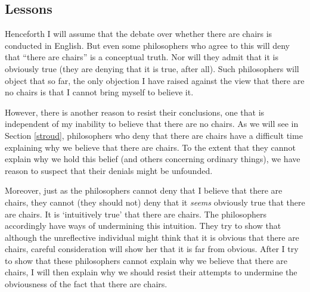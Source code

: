 \documentclass[11pt]{article}
\begin{document}
\begin{spacing}{1.25}
\section{Lessons}
Henceforth I will assume that the debate over whether there are chairs
is conducted in English.  But even some philosophers who agree to this
will deny that ``there are chairs'' is a conceptual truth.  Nor will
they admit that it is obviously true (they are denying that it is
true, after all).  Such philosophers will object that so far, the only
objection I have raised against the view that there are no chairs is
that I cannot bring myself to believe it.

However, there is another reason to resist their conclusions, one that
is independent of my inability to believe that there are no chairs.
As we will see in Section \ref{stroud}, philosophers who deny that
there are chairs have a difficult time explaining why we believe that
there are chairs.  To the extent that they cannot explain why we hold
this belief (and others concerning ordinary things), we have reason to
suspect that their denials might be unfounded.

Moreover, just as the philosophers cannot deny that I believe that
there are chairs, they cannot (they should not) deny that it {\em
  seems} obviously true that there are chairs.  It is `intuitively
true' that there are chairs.  The philosophers accordingly have ways
of undermining this intuition.  They try to show that although the
unreflective individual might think that it is obvious that there are
chairs, careful consideration will show her that it is far from
obvious.  After I try to show that these philosophers cannot explain
why we believe that there are chairs, I will then explain why we
should resist their attempts to undermine the obviousness of the fact
that there are chairs.

\ifstandalone
\end{spacing}


\fi
\end{document}
